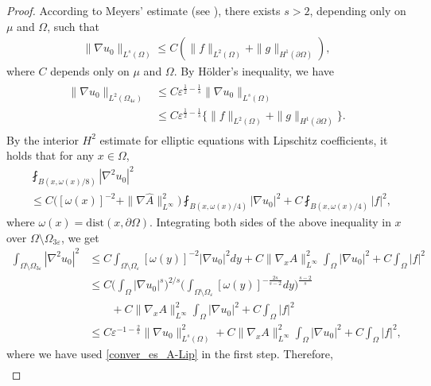 \documentclass[reqno,12pt]{amsart} %
\theoremstyle{definition}
\theoremstyle{remark}
\numberwithin{equation}{section}
\begin{document}
\begin{proof}
    According to Meyers' estimate (see \cite{Meyers1963, Giaquinta1983_book}), there exists $s>2$, depending only on $\mu$ and $\Omega$, such that
    \begin{align}\label{conver_es_Meyers}
        \|\nabla u_0\|_{L^s(\Omega)}\leq C( \|f\|_{L^2(\Omega)}+\|g\|_{H^1(\partial\Omega)}),
    \end{align}
    where $C$ depends only on $\mu$ and $\Omega$. By H\"{o}lder's inequality, we have
    \begin{align}\label{est.Du0.Oe}
    \begin{aligned}
        \|\nabla u_0\|_{L^2(\Omega_{4\varepsilon})}& \leq C\varepsilon^{\frac{1}{2}-\frac{1}{s}}\|\nabla u_0\|_{L^{s}(\Omega)} \\
        & \leq C\varepsilon^{\frac{1}{2}-\frac{1}{s}}\big\{\|f\|_{L^2(\Omega)}+\|g\|_{H^1(\partial\Omega)}\big\}. 
    \end{aligned}
    \end{align}
    By the interior $H^2$ estimate for elliptic equations with Lipschitz coefficients, it holds that for any $x\in \Omega$,
    \begin{align*}
        & \fint_{B(x, \omega(x)/8)}|\nabla^2 u_0|^2 \\
        & \leq C\Big([\omega(x)]^{-2}+\|\nabla\widehat{A}\|_{L^\infty}^2\Big)\fint_{B(x, \omega(x)/4)}|\nabla u_0|^2+C\fint_{B(x, \omega(x)/4)}|f|^2,
    \end{align*}
    where $\omega(x)=\mathrm{dist}(x, \partial \Omega)$. Integrating both sides of the above inequality in $x$ over $\Omega\setminus\Omega_{3\varepsilon}$, we get
    \begin{align*}
        \int_{\Omega\setminus\Omega_{3\varepsilon}}|\nabla^2 u_0|^2&\leq C\int_{\Omega\setminus\Omega_{\varepsilon}}[\omega(y)]^{-2}|\nabla u_0|^2dy+C\|\nabla_xA\|_{L^\infty}^2\int_\Omega|\nabla u_0|^2+C\int_\Omega |f|^2\\&\leq C\Big(\int_\Omega|\nabla u_0|^{s}\Big)^{2/s}\Big(\int_{\Omega\setminus\Omega_\varepsilon}[\omega(y)]^{-\frac{2s}{s-2}}dy\Big)^{\frac{s-2}{s}}\\&\qquad+C\|\nabla_xA\|_{L^\infty}^2\int_\Omega|\nabla u_0|^2+C\int_\Omega|f|^2\\&\leq C\varepsilon^{-1-\frac{2}{s}}\|\nabla u_0\|_{L^{s}(\Omega)}^2+C\|\nabla_xA\|_{L^\infty}^2\int_\Omega|\nabla u_0|^2+C\int_\Omega|f|^2,
    \end{align*}
    where we have used \eqref{conver_es_A-Lip} in the first step. Therefore,
    \begin{align}

\end{align}
\end{proof}
\end{document}
